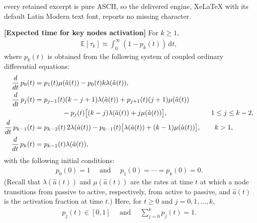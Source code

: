 \documentclass[10pt,a4paper]{amsart}
\newcommand{\E}{\mathbb{E}}
\newcommand{\ddd}{{\rm d}}
\newcommand{\dd}{\mathrm{d}}
\begin{document}
every retained excerpt is pure ASCII, so the delivered engine, XeLaTeX with its default Latin Modern text font, reports no missing character.
\begin{Theorem}{\bf [Expected time for key nodes activation]}
\label{th:tauk}
For $k \geq 1$, 
\begin{align}
\label{tauk}
\E[\tau_{k}]\approx\int_{0}^{\infty}(1-p_{k}(t))\, \dd t,
\end{align}
where $p_{k}(t)$ is obtained from the following system of coupled ordinary differential equations:
\begin{equation}
\label{ODEs}
\begin{aligned}
\frac{\ddd}{\ddd t}\,p_{0}(t) &= p_{1}(t)\mu(\hat{a}(t))-p_{0}(t)k\lambda(\hat{a}(t)),\\
\frac{\ddd}{\ddd t}\,p_{j}(t) &= p_{j-1}(t)(k-j+1) \lambda(\hat{a}(t))+p_{j+1}(t) (j+1)\mu(\hat{a}(t))\\
&\qquad \qquad -p_{j}(t)\big[(k - j)\lambda(\hat{a}(t)) + j\mu(\hat{a}(t))\big],
\qquad\qquad\qquad\,\, 1\leq j\leq k-2,\\
\frac{\ddd}{\ddd t}\,p_{k-1}(t) &= p_{k-2}(t)\, 2\lambda(\hat{a}(t))-p_{k-1}(t)\big[\lambda(\hat{a}(t)) 
+ (k-1)\mu(\hat{a}(t))\big],
\qquad k>1,\\
\frac{\ddd}{\ddd t}\,p_{k}(t) &= p_{k-1}(t) \lambda(\hat{a}(t)),
\end{aligned}
\end{equation}
with the following initial conditions:
\begin{align*}
p_{0}(0)=1 \quad \text{ and } \quad p_{1}(0)=\cdots =p_{k}(0)=0.
\end{align*}
(Recall that $\lambda(\hat{a}(t))$ and $\mu(\hat{a}(t))$ are the rates at time $t$ at which a node transitions from passive to active, respectively, from active to passive, and $\hat{a}(t)$ is the activation fraction at time $t$.) Here, for $t\geq 0$ and $j=0,1,\ldots ,k$,
\begin{align*}
p_{j}(t)\in [0,1] \quad\text{ and }\quad \sum_{j=0}^{k}p_{j}(t)=1.
\end{align*}
\end{Theorem}
\end{document}
